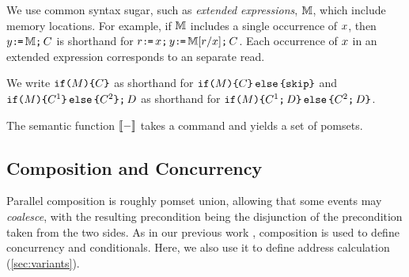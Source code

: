 We use common syntax sugar, such as \emph{extended expressions}, $\aEExp$,
which include memory locations.  For example, if $\aEExp$ includes a single
occurrence of $\aLoc$, then $\bLoc\GETS\aEExp\SEMI \aCmd$ is shorthand for
$\aReg\GETS\aLoc\SEMI\bLoc\GETS\aEExp[\aReg/\aLoc]\SEMI \aCmd$.  Each
occurrence of $\aLoc$ in an extended expression corresponds to an separate
read.

We write
$\IF{\aExp} \THEN \aCmd \FI$ as shorthand for
$\IF{\aExp} \THEN \aCmd\ELSE \SKIP\FI$ and
$\IF{\aExp} \THEN \aCmd^1 \ELSE \aCmd^2 \FI \SEMI \bCmd$ as shorthand for
$\IF{\aExp} \THEN \aCmd^1 \SEMI \bCmd\ELSE \aCmd^2 \SEMI \bCmd\FI$.

The semantic function $\sem[\aThrd]{-}$ takes a command and
yields a set of pomsets.






\subsection{Composition and Concurrency}
\label{sec:par}
Parallel composition is roughly pomset union, allowing that some events may
\emph{coalesce}, with the resulting precondition being the disjunction of the
precondition taken from the two sides.  As in our previous work
\cite{2019-sp}, composition is used to define concurrency and conditionals.
Here, we also use it to define address calculation
(\textsection\ref{sec:variants}).  %

